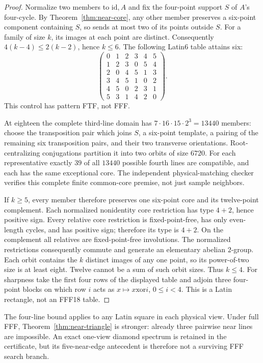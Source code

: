 \begin{proof}
Normalize two members to $\mathrm{id},A$ and fix the four-point support
$S$ of $A$'s four-cycle. By Theorem~\ref{thm:near-core}, any other
member preserves a six-point component containing $S$, so sends at
most two of its points outside $S$. For a family of size $k$, its
images at each point are distinct. Consequently
$4(k-4)\leq2(k-2)$, hence $k\leq6$.
The following Latin6 table attains six:
\[
\begin{pmatrix}
0&1&2&3&4&5\\1&2&3&0&5&4\\2&0&4&5&1&3\\
3&4&5&1&0&2\\4&5&0&2&3&1\\5&3&1&4&2&0
\end{pmatrix}.
\]
This control has pattern FTF, not FFF.

At eighteen the complete third-line domain has
$7\cdot16\cdot15\cdot2^3=13440$ members: choose the transposition
pair which joins $S$, a six-point template, a pairing of the remaining
six transposition pairs, and their two transverse orientations.
Root-centralizing conjugations partition it into two orbits of size
$6720$. For each representative exactly $39$ of all $13440$ possible
fourth lines are compatible, and each has the same exceptional core.
The independent physical-matching checker verifies this complete
finite common-core premise, not just sample neighbors.

If $k\geq5$, every member therefore preserves one six-point core
and its twelve-point complement. Each normalized nonidentity core
restriction has type $4+2$, hence positive sign. Every relative core
restriction is fixed-point-free, has only even-length cycles, and has
positive sign; therefore its type is $4+2$. On the complement all relatives are
fixed-point-free involutions. The normalized restrictions consequently
commute and generate an elementary abelian $2$-group. Each orbit
contains the $k$ distinct images of any one point, so its power-of-two
size is at least eight. Twelve cannot be a sum of such orbit sizes.
Thus $k\leq4$. For sharpness take the first four rows of the displayed
table and adjoin three four-point blocks on which row $i$ acts as
$x\mapsto x\mathbin{\mathrm{xor}}i$, $0\leq i<4$.
This is a Latin rectangle, not an FFF18 table.
\end{proof}

The four-line bound applies to any Latin square in each physical view.
Under full FFF, Theorem~\ref{thm:near-triangle} is stronger: already
three pairwise near lines are impossible. An exact one-view diamond
spectrum is retained in the certificate, but its five-near-edge
antecedent is therefore not a surviving FFF search branch.

